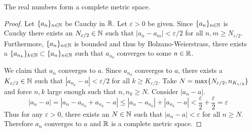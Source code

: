 \documentclass[notitlepage]{simple}
\begin{document}
\begin{thm}
	The real numbers form a complete metric space.
\end{thm}
\begin{proof}
	Let $\lbrace a_n \rbrace_{n\in\mathbb{N}}$ be Cauchy in $\mathbb{R}$.
	Let $\varepsilon > 0$ be given.
	Since $\lbrace a_n \rbrace_{n\in\mathbb{N}}$ is Cauchy there exists an $N_{\varepsilon/2}\in\mathbb{N}$ such that $|a_n-a_m|<\varepsilon/2$ for all $n,m\geq N_{\varepsilon/2}$.
	Furthermore, $\lbrace a_n \rbrace_{n\in\mathbb{N}}$ is bounded and thus by Bolzano-Weierstrass, there exists a $\lbrace a_{n_k} \rbrace_{k\in\mathbb{N}}\subset\lbrace a_n \rbrace_{n\in\mathbb{N}}$ such that $a_{n_k}$ converges to some $a\in\mathbb{R}$.

	We claim that $a_n$ converges to $a$.
	Since $a_{n_k}$ converges to $a$, there exists a $K_{\varepsilon/2}\in\mathbb{N}$ such that $|a_{n_k}-a|<\varepsilon/2$ for all $k\geq K_{\varepsilon/2}$.
	Take $N=\max\lbrace N_{\varepsilon/2},n_{K_{\varepsilon/2}} \rbrace$ and force $n,k$ large enough such that $n,n_k\geq N$.
	Consider $|a_n-a|$.
	\[
		|a_n-a|=|a_n-a_{n_k}+a_{n_k}-a|\leq |a_n-a_{n_k}|+|a_{n_k}-a|<\frac{\varepsilon}{2}+\frac{\varepsilon}{2}=\varepsilon
	\]
	Thus for any $\varepsilon >0$, there exists an $N\in\mathbb{N}$ such that $|a_n-a|<\varepsilon$ for all $n\geq N$.
	Therefore $a_n$ converges to $a$ and $\mathbb{R}$ is a complete metric space.
\end{proof}
\end{document}
